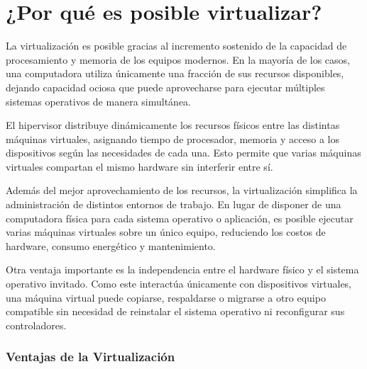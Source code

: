 \section{¿Por qué es posible virtualizar?}

La virtualización es posible gracias al incremento sostenido de la capacidad de procesamiento y memoria de los equipos modernos. En la mayoría de los casos, una computadora utiliza únicamente una fracción de sus recursos disponibles, dejando capacidad ociosa que puede aprovecharse para ejecutar múltiples sistemas operativos de manera simultánea.

El hipervisor distribuye dinámicamente los recursos físicos entre las distintas máquinas virtuales, asignando tiempo de procesador, memoria y acceso a los dispositivos según las necesidades de cada una. Esto permite que varias máquinas virtuales compartan el mismo hardware sin interferir entre sí.

Además del mejor aprovechamiento de los recursos, la virtualización simplifica la administración de distintos entornos de trabajo. En lugar de disponer de una computadora física para cada sistema operativo o aplicación, es posible ejecutar varias máquinas virtuales sobre un único equipo, reduciendo los costos de hardware, consumo energético y mantenimiento.

Otra ventaja importante es la independencia entre el hardware físico y el sistema operativo invitado. Como este interactúa únicamente con dispositivos virtuales, una máquina virtual puede copiarse, respaldarse o migrarse a otro equipo compatible sin necesidad de reinstalar el sistema operativo ni reconfigurar sus controladores.

\subsubsection{Ventajas de la Virtualización}

